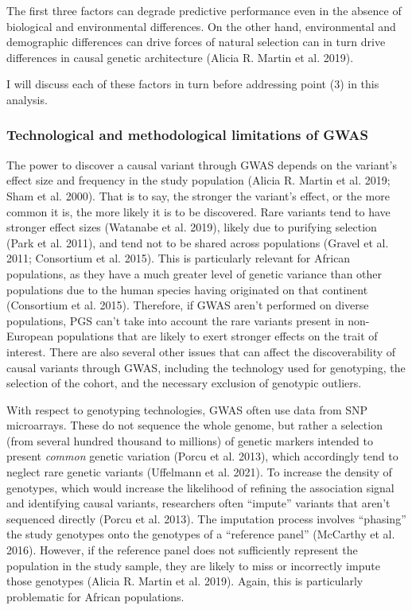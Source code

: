 \documentclass[
]{book}
\begin{document}
The first three factors can degrade predictive performance even in the absence of biological and environmental differences. On the other hand, environmental and demographic differences can drive forces of natural selection can in turn drive differences in causal genetic architecture (Alicia R. Martin et al. 2019).

I will discuss each of these factors in turn before addressing point (3) in this analysis.

\hypertarget{fst-discovery-sec}{%
\subsubsection{Technological and methodological limitations of GWAS}\label{fst-discovery-sec}}

The power to discover a causal variant through GWAS depends on the variant's effect size and frequency in the study population (Alicia R. Martin et al. 2019; Sham et al. 2000). That is to say, the stronger the variant's effect, or the more common it is, the more likely it is to be discovered. Rare variants tend to have stronger effect sizes (Watanabe et al. 2019), likely due to purifying selection (Park et al. 2011), and tend not to be shared across populations (Gravel et al. 2011; Consortium et al. 2015). This is particularly relevant for African populations, as they have a much greater level of genetic variance than other populations due to the human species having originated on that continent (Consortium et al. 2015). Therefore, if GWAS aren't performed on diverse populations, PGS can't take into account the rare variants present in non-European populations that are likely to exert stronger effects on the trait of interest. There are also several other issues that can affect the discoverability of causal variants through GWAS, including the technology used for genotyping, the selection of the cohort, and the necessary exclusion of genotypic outliers.

With respect to genotyping technologies, GWAS often use data from SNP microarrays. These do not sequence the whole genome, but rather a selection (from several hundred thousand to millions) of genetic markers intended to present \emph{common} genetic variation (Porcu et al. 2013), which accordingly tend to neglect rare genetic variants (Uffelmann et al. 2021). To increase the density of genotypes, which would increase the likelihood of refining the association signal and identifying causal variants, researchers often ``impute'' variants that aren't sequenced directly (Porcu et al. 2013). The imputation process involves ``phasing'' the study genotypes onto the genotypes of a ``reference panel'' (McCarthy et al. 2016). However, if the reference panel does not sufficiently represent the population in the study sample, they are likely to miss or incorrectly impute those genotypes (Alicia R. Martin et al. 2019). Again, this is particularly problematic for African populations.
\end{document}
